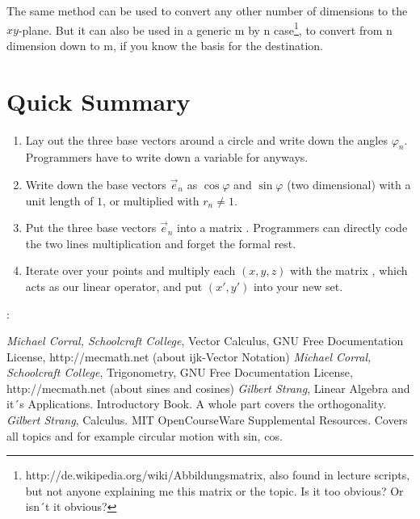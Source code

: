\documentclass{article}
\begin{document}
The same method can be used to convert any other number of dimensions to the $xy$-plane. But it can also be
used in a generic m by n case\footnote{http://de.wikipedia.org/wiki/Abbildungsmatrix, also found in lecture scripts, but not anyone explaining me this matrix or the topic. Is it too obvious? Or isn´t it obvious?}, to convert from n dimension down to m, if you know the basis for the destination.

\section{Quick Summary}

\begin{enumerate}
\item Lay out the three base vectors around a circle and write down the angles $\varphi_n$. Programmers have to write down a variable for anyways.
\item Write down the base vectors $\vec{e}_n$ as $\cos \varphi$ and $\sin \varphi$ (two dimensional) with a unit length of $1$, or multiplied with $r_n \ne 1$.
\item Put the three base vectors $\vec{e}_n$ into a matrix . Programmers can directly code the two lines multiplication and forget the formal rest.
\item Iterate over your points and multiply each $(x,y,z)$ with the matrix , which acts as our linear operator, and put $(x',y')$ into your new set.
\end{enumerate}

:\\

\begin{thebibliography}
    \bibitem{[Corr09]} \textit{Michael Corral, Schoolcraft College},
		    Vector Calculus, GNU Free Documentation License, http://mecmath.net (about ijk-Vector Notation) 
    \bibitem{[Corr09]} \textit{Michael Corral, Schoolcraft College},
		    Trigonometry, GNU Free Documentation License, http://mecmath.net (about sines and cosines)
    \bibitem{[Strang]} \textit{Gilbert Strang},
		    Linear Algebra and it´s Applications. Introductory Book. A whole part covers the orthogonality.
    \bibitem{[Strang]} \textit{Gilbert Strang},
            Calculus. MIT OpenCourseWare Supplemental Resources. Covers all topics and for example circular motion with sin, cos.
\end{thebibliography}

\printindex
\end{document}
